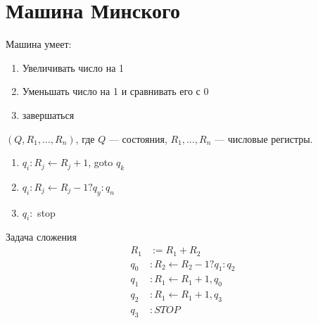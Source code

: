 \documentclass[a4paper]{article}
\begin{document}
\section{Машина Минского}
{\large Машина умеет:
\begin{enumerate}
\item Увеличивать число на 1
\item Уменьшать число на 1 и сравнивать его с 0
\item завершаться 
\end{enumerate}
$(Q, R_{1}, \dots, R_{n})$, где $Q$ --- состояния, $R_{1}, \dots, R_{n}$ --- числовые регистры.
\begin{enumerate}[label=(\roman*)]
\item $q_{i}: R_{j} \gets R_{j} + 1$, goto $q_{k}$
\item $q_{i}: R_{j} \gets R_{j} - 1  ?  q_{y}:q_{n} $
\item $q_{i}:$ stop
\end{enumerate}

Задача сложения
\begin{align*}
    R_{1} &:= R_{1} + R_{2} \\
    q_{0} &: R_{2} \gets R_{2} - 1  ?  q_{1}:q_{2} \\
    q_{1} &: R_{1} \gets R_{1} + 1, q_{0}\\
    q_{2} &: R_{1} \gets R_{1} + 1, q_{3}\\
    q_{3} &: STOP\\
\end{align*}}
\end{document}

